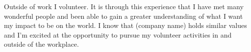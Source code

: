 Outside of work I volunteer. It is through this experience that I have met many wonderful people and been able to gain a greater understanding of what I want my impact to be on the world. I know that (company name) holds similar values and I'm excited at the opportunity to pursue my volunteer activities in and outside of the workplace.
